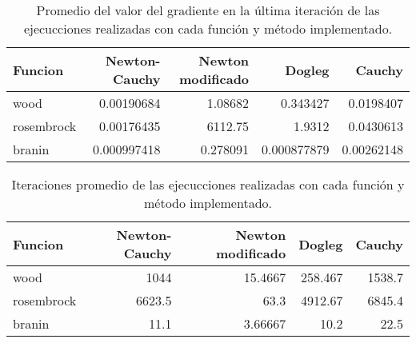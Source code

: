 \begin{table}[H]
    \centering
    \begin{tabular}{lrrrr}
        \hline
        \textbf{Funcion} & \textbf{Newton-Cauchy} & \textbf{Newton modificado} & \textbf{Dogleg} & \textbf{Cauchy} \\ \hline
        wood             & 0.00190684             & 1.08682                    & 0.343427        & 0.0198407       \\
        rosembrock       & 0.00176435             & 6112.75                    & 1.9312          & 0.0430613       \\
        branin           & 0.000997418            & 0.278091                   & 0.000877879     & 0.00262148      \\
        \hline
    \end{tabular}
    \caption{Promedio del valor del gradiente en la última iteración de las ejecucciones realizadas con cada función y método implementado.}
    \label{table:gradient}
\end{table}

\begin{table}[H]
    \centering
    \begin{tabular}{lrrrr}
        \hline
        \textbf{Funcion} & \textbf{Newton-Cauchy} & \textbf{Newton modificado} & \textbf{Dogleg} & \textbf{Cauchy} \\
        \hline
        wood             & 1044                   & 15.4667                    & 258.467         & 1538.7          \\
        rosembrock       & 6623.5                 & 63.3                       & 4912.67         & 6845.4          \\
        branin           & 11.1                   & 3.66667                    & 10.2            & 22.5            \\
        \hline
    \end{tabular}
    \caption{Iteraciones promedio de las ejecucciones realizadas con cada función y método implementado.}
    \label{table:iterations}
\end{table}